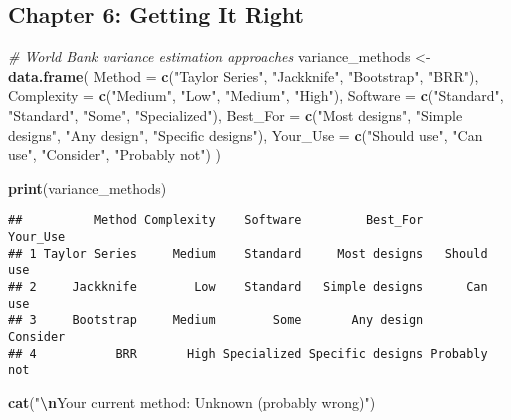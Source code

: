 \documentclass[
]{article}
\newenvironment{Shaded}{\begin{snugshade}}{\end{snugshade}}
\newcommand{\AttributeTok}[1]{\textcolor[rgb]{0.13,0.29,0.53}{#1}}
\newcommand{\CommentTok}[1]{\textcolor[rgb]{0.56,0.35,0.01}{\textit{#1}}}
\newcommand{\FunctionTok}[1]{\textcolor[rgb]{0.13,0.29,0.53}{\textbf{#1}}}
\newcommand{\NormalTok}[1]{#1}
\newcommand{\OtherTok}[1]{\textcolor[rgb]{0.56,0.35,0.01}{#1}}
\newcommand{\SpecialCharTok}[1]{\textcolor[rgb]{0.81,0.36,0.00}{\textbf{#1}}}
\newcommand{\StringTok}[1]{\textcolor[rgb]{0.31,0.60,0.02}{#1}}
\begin{document}
\subsection{Chapter 6: Getting It
Right}\label{chapter-6-getting-it-right}

\begin{Shaded}
\begin{Highlighting}[]
\CommentTok{\# World Bank variance estimation approaches}
\NormalTok{variance\_methods }\OtherTok{\textless{}{-}} \FunctionTok{data.frame}\NormalTok{(}
  \AttributeTok{Method =} \FunctionTok{c}\NormalTok{(}\StringTok{"Taylor Series"}\NormalTok{, }\StringTok{"Jackknife"}\NormalTok{, }\StringTok{"Bootstrap"}\NormalTok{, }\StringTok{"BRR"}\NormalTok{),}
  \AttributeTok{Complexity =} \FunctionTok{c}\NormalTok{(}\StringTok{"Medium"}\NormalTok{, }\StringTok{"Low"}\NormalTok{, }\StringTok{"Medium"}\NormalTok{, }\StringTok{"High"}\NormalTok{),}
  \AttributeTok{Software =} \FunctionTok{c}\NormalTok{(}\StringTok{"Standard"}\NormalTok{, }\StringTok{"Standard"}\NormalTok{, }\StringTok{"Some"}\NormalTok{, }\StringTok{"Specialized"}\NormalTok{),}
  \AttributeTok{Best\_For =} \FunctionTok{c}\NormalTok{(}\StringTok{"Most designs"}\NormalTok{, }\StringTok{"Simple designs"}\NormalTok{, }
               \StringTok{"Any design"}\NormalTok{, }\StringTok{"Specific designs"}\NormalTok{),}
  \AttributeTok{Your\_Use =} \FunctionTok{c}\NormalTok{(}\StringTok{"Should use"}\NormalTok{, }\StringTok{"Can use"}\NormalTok{, }\StringTok{"Consider"}\NormalTok{, }\StringTok{"Probably not"}\NormalTok{)}
\NormalTok{)}

\FunctionTok{print}\NormalTok{(variance\_methods)}
\end{Highlighting}
\end{Shaded}

\begin{verbatim}
##          Method Complexity    Software         Best_For     Your_Use
## 1 Taylor Series     Medium    Standard     Most designs   Should use
## 2     Jackknife        Low    Standard   Simple designs      Can use
## 3     Bootstrap     Medium        Some       Any design     Consider
## 4           BRR       High Specialized Specific designs Probably not
\end{verbatim}

\begin{Shaded}
\begin{Highlighting}[]
\FunctionTok{cat}\NormalTok{(}\StringTok{"}\SpecialCharTok{\textbackslash{}n}\StringTok{Your current method: Unknown (probably wrong)"}\NormalTok{)}
\end{Highlighting}
\end{Shaded}
\end{document}
